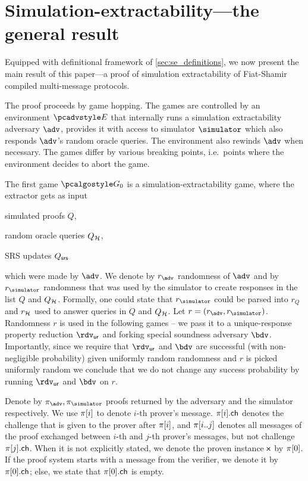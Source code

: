 \section{Simulation-extractability---the general result}
\label{sec:general}
Equipped with definitional framework of \cref{sec:se_definitions}, we now present the
main result of this paper---a proof of simulation extractability of
Fiat-Shamir compiled multi-message protocols.

The proof proceeds by game hopping. The games are controlled by an environment $\env$ that
internally runs a simulation extractability adversary $\advse$, provides it with access to
simulator $\simulator$ which also responds $\adv$'s random oracle queries. The environment
also rewinds $\adv$ when necessary. The games differ by various breaking points,
i.e.~points where the environment decides to abort the game.

The first game $\game{0}$ is a simulation-extractability game, where the extractor
gets as input
\begin{inparaenum}[(1)]
\item simulated proofs $Q$,
\item random oracle queries $Q_{\mathcal{H}}$,
\item SRS updates $Q_{\mathsf{srs}}$
\end{inparaenum}
which were made by $\advse$.  We denote by $\radv$ randomness of $\advse$ and by
$\rsim$ randomness that was used by the simulator to create responses in the list $Q$
and $Q_{\mathcal{H}}$. Formally, one could state that $\rsim$ could be parsed into $r_Q$ and
$r_{\mathcal{H}}$ used to answer queries in $Q$ and $Q_{\mathcal{H}}$. Let $r = (\radv,
\rsim)$. Randomness $r$ is used in the following games -- we pass it to a
unique-response property reduction $\rdvur$ and forking special soundness adversary
$\bdv$. Importantly, since we require that $\rdvur$ and $\bdv$ are successful (with
non-negligible probability) given uniformly random randomness and $r$ is picked
uniformly random we conclude that we do not change any success probability by running
$\rdvur$ and $\bdv$ on $r$.

Denote by $\zkproof_{\advse}, \zkproof_{\simulator}$ proofs returned by the adversary
and the simulator respectively. We use $\pi[i]$ to denote $i$-th prover's
message. $\pi[i].\mathsf{ch}$ denotes the challenge that is given to the prover after
$\pi[i]$, and $\pi[i..j]$ denotes all messages of the proof exchanged
between $i$-th and $j$-th prover's messages, but not challenge
$\pi[j].\mathsf{ch}$. When it is not explicitly stated, we denote the proven instance
$\mathsf{x}$ by $\pi[0]$. If the proof system starts with a message from the verifier,
we denote it by $\pi[0].\mathsf{ch}$; else, we state that $\pi[0].\mathsf{ch}$ is empty.

